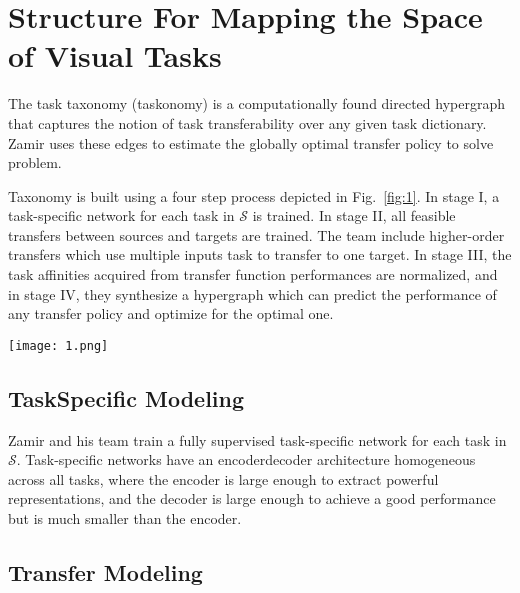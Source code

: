 \documentclass[10pt,twocolumn,letterpaper]{article}
\begin{document}
\section{Structure For Mapping the Space of Visual Tasks}

The task taxonomy (taskonomy) is a computationally found directed hypergraph that captures the notion of task transferability over any given task dictionary. Zamir uses these edges to estimate the globally optimal transfer policy to solve problem. 

Taxonomy is built using a four step process depicted in Fig.~\ref{fig:1}. In stage I, a task-specific network for each task in $\mathcal{S}$ is trained. In stage II, all feasible transfers between sources and targets are trained. The team include higher-order transfers which use multiple inputs task to transfer to one target. In stage III, the task affinities acquired from transfer function performances are normalized, and in stage IV, they synthesize a hypergraph which can predict the performance of any transfer policy and optimize for the optimal one.

\begin{figure*}
	\begin{center}
		\texttt{[image: 1.png]}
	\end{center}
	\caption{{\bfseries Computational modeling of task relations and creating the taxonomy.} From left to right: I. Train task-specific networks. II. Train transfer functions among tasks in a latent space. III. Get normalized transfer affinities using Analytic Hierarchy Process. IV. Find global transfer taxonomy using Binary Integer Program.}
	\label{fig:1}
\end{figure*}

\subsection{TaskSpecific Modeling}

Zamir and his team train a fully supervised task-specific network for each task in $\mathcal{S}$. Task-specific networks have an encoderdecoder architecture homogeneous across all tasks, where the encoder is large enough to extract powerful representations, and the decoder is large enough to achieve a good performance but is much smaller than the encoder.

\subsection{Transfer Modeling}
\end{document}

